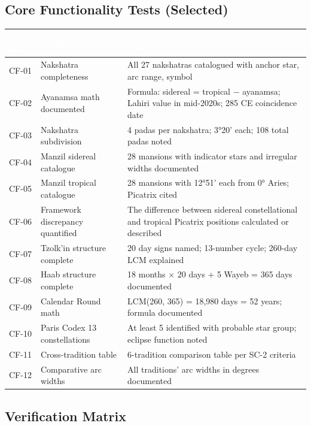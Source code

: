 \documentclass[11pt,letterpaper]{article}
\newcommand{\tableheader}[1]{\textbf{\sffamily\textcolor{white}{#1}}}
\begin{document}
\subsection{Core Functionality Tests (Selected)}

\begin{center}
\begin{tabularx}{\textwidth}{L{1.5cm}L{3.5cm}X}
\toprule
{}
\tableheader{Test ID} & \tableheader{Verifies} & \tableheader{Expected} \\
\midrule
CF-01 & Nakshatra completeness & All 27 nakshatras catalogued with anchor star, arc range, symbol \\
CF-02 & Ayanamsa math documented & Formula: sidereal = tropical $-$ ayanamsa; Lahiri value in mid-2020s; 285 CE coincidence date \\
CF-03 & Nakshatra subdivision & 4 padas per nakshatra; 3°20' each; 108 total padas noted \\
CF-04 & Manzil sidereal catalogue & 28 mansions with indicator stars and irregular widths documented \\
CF-05 & Manzil tropical catalogue & 28 mansions with 12°51' each from 0° Aries; Picatrix cited \\
CF-06 & Framework discrepancy quantified & The difference between sidereal constellational and tropical Picatrix positions calculated or described \\
CF-07 & Tzolk'in structure complete & 20 day signs named; 13-number cycle; 260-day LCM explained \\
CF-08 & Haab structure complete & 18 months × 20 days + 5 Wayeb = 365 days documented \\
CF-09 & Calendar Round math & LCM(260, 365) = 18,980 days = 52 years; formula documented \\
CF-10 & Paris Codex 13 constellations & At least 5 identified with probable star group; eclipse function noted \\
CF-11 & Cross-tradition table & 6-tradition comparison table per SC-2 criteria \\
CF-12 & Comparative arc widths & All traditions' arc widths in degrees documented \\
\bottomrule
\end{tabularx}
\end{center}

\subsection{Verification Matrix}
\end{document}
